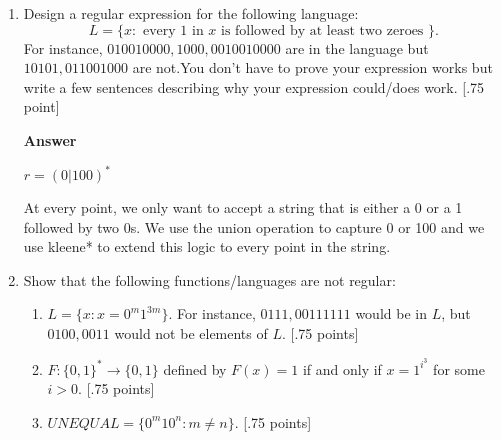 \documentclass[11pt]{article}
\newcommand \kw[1]{\textbf{#1}}
\newenvironment{answer}{
\vspace{.5cm}
\begin{mdframed}[]
    \kw{Answer} 
}
{
\end{mdframed}
\pagebreak
}
\begin{document}
\begin{enumerate}
\begin{answer}
    So if there are $n$ 0s or 1s in the regex, we will have at most $2n$ states in the NFA representing them. We know that each of $n, c, u, k < m \therefore O(2n + 0c + u + k) = O(m)$ states in the NFA.
\end{answer}

\item Design a regular expression for the following language: 
$$L = \{x: \text{ every $1$ in $x$ is followed by at least two zeroes }\}.$$
For instance, $010010000,1000,0010010000$ are in the language but $10101, 011001000$ are not.You don't have to prove your expression works but write a few sentences describing why your expression could/does work. [.75 point]

\begin{answer}
    $r = (0 | 100)^*$

    \vspace{.5cm}

    At every point, we only want to accept a string that is either a 0 or a 1 followed by two 0s. We use the union operation to capture 0 or 100 and we use kleene* to extend this logic to every point in the string.
\end{answer}

\item Show that the following functions/languages are not regular: 
\begin{enumerate}
\item $L = \{x: x = 0^m 1^{3m}\}$. For instance, $0111, 00111111$ would be in $L$, but $0100, 0011$ would not be elements of $L$. [.75 points]

\item $F:\{0,1\}^* \rightarrow \{0,1\}$ defined by $F(x) = 1$ if and only if $x = 1^{i^3}$ for some $i > 0$. [.75 points]
\item $UNEQUAL = \{0^m 1 0^n: m \neq n\}$. [.75 points]


\end{enumerate}


\end{enumerate}
\end{document}

